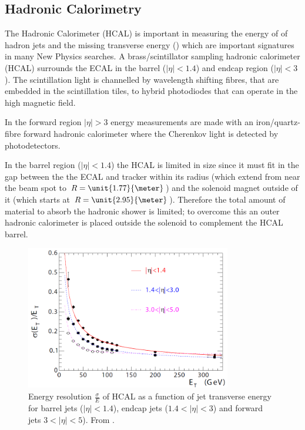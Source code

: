 \subsection{Hadronic Calorimetry}

The Hadronic Calorimeter (HCAL) is important in measuring the energy of of
hadron jets and the missing transverse energy (\met) which are important
signatures in many New Physics searches.
A brass/scintillator sampling hadronic calorimeter (HCAL) surrounds the ECAL in
the barrel ($|\eta| < 1.4$) and endcap region ($|\eta| < 3$). 
The scintillation light is channelled by wavelength shifting fibres, that are
embedded in the scintillation tiles, to hybrid photodiodes that can operate in
the high magnetic field. \cite{cms}

In the forward region $|\eta| > 3$ energy measurements are made with an
iron/quartz-fibre forward hadronic calorimeter where the Cherenkov light is
detected by photodetectors.\cite{cms}

In the barrel region ($|\eta| < 1.4$) the HCAL is limited in size since it must
fit in the gap between the the ECAL and tracker within its radius (which extend
from near the beam spot to $R = \unit{1.77}{\meter}$) and the solenoid magnet
outside of it (which starts at $R = \unit{2.95}{\meter}$).
Therefore the total amount of material to absorb the hadronic shower is
limited; to overcome this an outer hadronic calorimeter is placed outside the
solenoid to complement the HCAL barrel.\cite{cms}

\begin{figure}[htb!]
  \centering
  \includegraphics[width=0.8\textwidth]{HCAL}
  \caption{Energy resolution $\frac{\sigma}{E}$ of HCAL as a function of jet
  \label{fig:HCAL}
transverse energy for barrel jets ($|\eta| < 1.4$), endcap jets ($1.4<|\eta| <
3$) and forward jets $3<|\eta| < 5$). From \cite{cms}.}
\end{figure}


